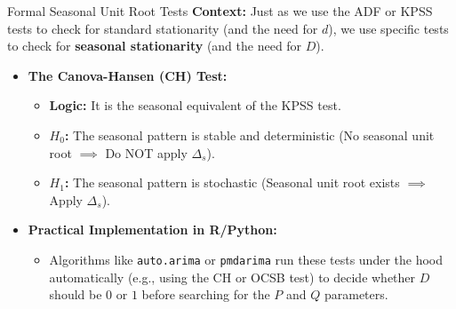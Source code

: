 \documentclass[aspectratio=169]{beamer}
\begin{document}
\begin{frame}{Formal Seasonal Unit Root Tests}
\textbf{Context:} Just as we use the ADF or KPSS tests to check for standard stationarity (and the need for $d$), we use specific tests to check for \textbf{seasonal stationarity} (and the need for $D$).

\vspace{0.3cm}

\begin{itemize}
    \item \textbf{The Canova-Hansen (CH) Test:}
    \begin{itemize}
        \item \textbf{Logic:} It is the seasonal equivalent of the KPSS test. 
        \item \textbf{$H_0$:} The seasonal pattern is stable and deterministic (No seasonal unit root $\implies$ Do NOT apply $\Delta_s$).
        \item \textbf{$H_1$:} The seasonal pattern is stochastic (Seasonal unit root exists $\implies$ Apply $\Delta_s$).
    \end{itemize}
    
    \vspace{0.3cm}
    
    \item \textbf{Practical Implementation in R/Python:}
    \begin{itemize}
        \item Algorithms like \texttt{auto.arima} or \texttt{pmdarima} run these tests under the hood automatically (e.g., using the CH or OCSB test) to decide whether $D$ should be $0$ or $1$ before searching for the $P$ and $Q$ parameters.
    \end{itemize}
\end{itemize}
\end{frame}
\end{document}
